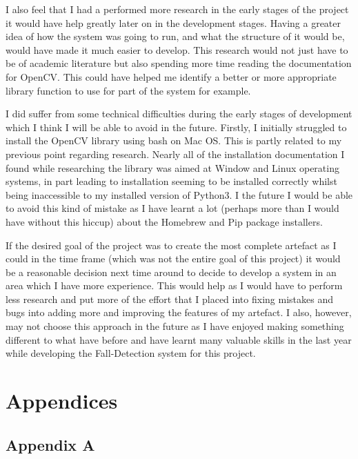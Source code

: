 \documentclass[11pt,a4paper]{report}
\begin{document}
I also feel that I had a performed more research in the early stages of the project it would have help greatly later on in the development stages. Having a greater idea of how the system was going to run, and what the structure of it would be, would have made it much easier to develop. This research would not just have to be of academic literature but also spending more time reading the documentation for OpenCV. This could have helped me identify a better or more appropriate library function to use for part of the system for example.

I did suffer from some technical difficulties during the early stages of development which I think I will be able to avoid in the future. Firstly, I initially struggled to install the OpenCV library using bash on Mac OS. This is partly related to my previous point regarding research. Nearly all of the installation documentation I found while researching the library was aimed at Window and Linux operating systems, in part leading to installation seeming to be installed correctly whilst being inaccessible to my installed version of Python3. I the future I would be able to avoid this kind of mistake as I have learnt a lot (perhaps more than I would have without this hiccup) about the Homebrew and Pip package installers.

If the desired goal of the project was to create the most complete artefact as I could in the time frame (which was not the entire goal of this project) it would be a reasonable decision next time around to decide to develop a system in an area which I have more experience. This would help as I would have to perform less research and put more of the effort that I placed into fixing mistakes and bugs into adding more and improving the features of my artefact. I also, however, may not choose this approach in the future as I have enjoyed making something different to what have before and have learnt many valuable skills in the last year while developing the Fall-Detection system for this project.

\renewcommand\bibname{References}

\pagebreak
\clearpage

\appendix
\section{Appendices}
\subsection{Appendix A}
\end{document}
